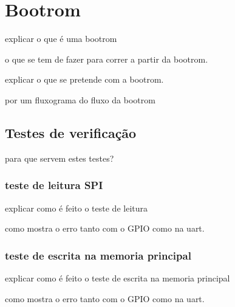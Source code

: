 
\chapter{Bootrom}
\label{chapter:Bootrom}

explicar o que \'e uma bootrom

o que se tem de fazer para correr a partir da bootrom.

explicar o que se pretende com a bootrom.

por um fluxograma do fluxo da bootrom 

\section{Testes de verifica\c{c}\~ao}

para que servem estes testes?

\subsection{teste de leitura SPI}

explicar como é feito o teste de leitura 

como mostra o erro tanto com o GPIO como na uart.

\subsection{teste de escrita na memoria principal }

explicar como é feito o teste de escrita na memoria principal 

como mostra o erro tanto com o GPIO como na uart.